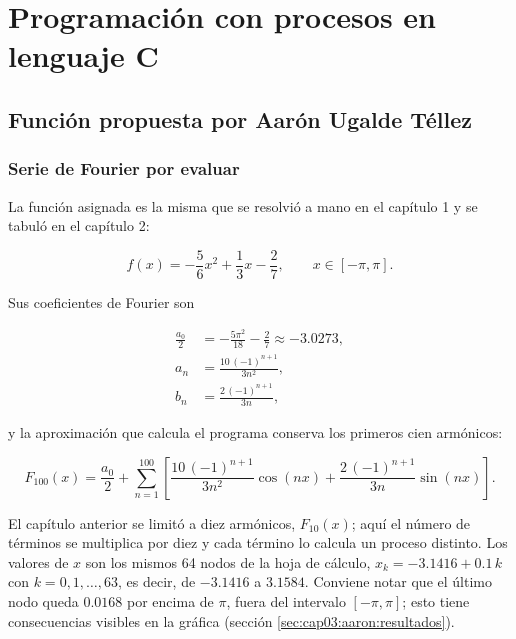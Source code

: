 \section{Programación con procesos en lenguaje C}
\label{sec:cap03:programacion}

\subsection{Función propuesta por Aarón Ugalde Téllez}
\label{sec:cap03:aaron}

\subsubsection{Serie de Fourier por evaluar}
\label{sec:cap03:aaron:serie}

La función asignada es la misma que se resolvió a mano en el capítulo 1 y se tabuló en el capítulo 2:

\begin{equation}
    f(x) = -\frac{5}{6}x^{2} + \frac{1}{3}x - \frac{2}{7},
    \qquad x \in [-\pi, \pi].
    \label{eq:cap03:aaron:funcion}
\end{equation}

Sus coeficientes de Fourier son

\begin{align}
    \frac{a_0}{2} &= -\frac{5\pi^{2}}{18} - \frac{2}{7} \approx -3.0273, \label{eq:cap03:aaron:a0}\\[4pt]
    a_n &= \frac{10\,(-1)^{n+1}}{3n^{2}}, \label{eq:cap03:aaron:an}\\[4pt]
    b_n &= \frac{2\,(-1)^{n+1}}{3n}, \label{eq:cap03:aaron:bn}
\end{align}

y la aproximación que calcula el programa conserva los primeros cien armónicos:

\begin{equation}
    F_{100}(x) = \frac{a_0}{2} + \sum_{n=1}^{100}
    \left[ \frac{10\,(-1)^{n+1}}{3n^{2}}\cos(nx) + \frac{2\,(-1)^{n+1}}{3n}\sin(nx) \right].
    \label{eq:cap03:aaron:serie100}
\end{equation}

El capítulo anterior se limitó a diez armónicos, $F_{10}(x)$; aquí el número de términos se multiplica por diez y cada término lo calcula un proceso distinto. Los valores de $x$ son los mismos 64 nodos de la hoja de cálculo, $x_k = -3.1416 + 0.1\,k$ con $k = 0, 1, \dots, 63$, es decir, de $-3.1416$ a $3.1584$. Conviene notar que el último nodo queda $0.0168$ por encima de $\pi$, fuera del intervalo $[-\pi, \pi]$; esto tiene consecuencias visibles en la gráfica (sección \ref{sec:cap03:aaron:resultados}).

